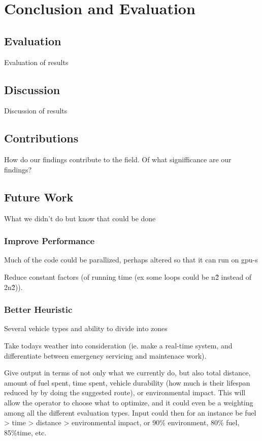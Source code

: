 \chapter{Conclusion and Evaluation}

\section{Evaluation}
Evaluation of results

\section{Discussion}
Discussion of results

\section{Contributions}
How do our findings contribute to the field. Of what signifficance are our findings?

\section{Future Work}
What we didn't do but know that could be done

\subsection{Improve Performance}
Much of the code could be parallized, perhaps altered so that it can run on gpu-s

Reduce constant factors (of running time (ex some loops could be n\^2 instead of 2\*n\^2)).

\subsection{Better Heuristic}
Several vehicle types and ability to divide into zones

Take todays weather into consideration (ie. make a real-time system, and differentiate between emergency servicing and maintenace work).

Give output in terms of not only what we currently do, but also total distance, amount of fuel spent, time spent, vehicle durability (how much is their lifespan reduced by by doing the suggested route), or environmental impact. This will allow the operator to choose what to optimize, and it could even be a weighting among all the different evaluation types. Input could then for an instance be fuel > time > distance > environmental impact, or 90\% environment, 80\% fuel, 85\%time, etc.

\cleardoublepage
